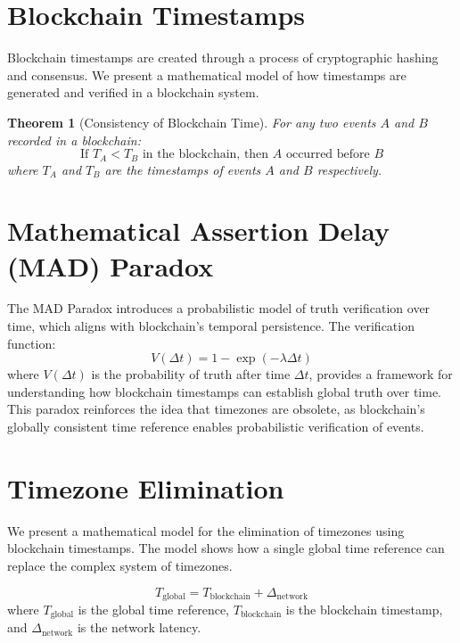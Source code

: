 \documentclass[12pt]{report}
\newtheorem{theorem}{Theorem}
\begin{document}
\section{Blockchain Timestamps}
Blockchain timestamps are created through a process of cryptographic hashing and consensus. We present a mathematical model of how timestamps are generated and verified in a blockchain system.

\begin{theorem}[Consistency of Blockchain Time]
For any two events \( A \) and \( B \) recorded in a blockchain:
\begin{equation}
\text{If } T_A < T_B \text{ in the blockchain, then } A \text{ occurred before } B
\end{equation}
where \( T_A \) and \( T_B \) are the timestamps of events \( A \) and \( B \) respectively.
\end{theorem}

\section{Mathematical Assertion Delay (MAD) Paradox}
The MAD Paradox \cite{Houk2024} introduces a probabilistic model of truth verification over time, which aligns with blockchain's temporal persistence. The verification function:
\[
V(\Delta t) = 1 - \exp\left(-\lambda \Delta t\right)
\]
where \( V(\Delta t) \) is the probability of truth after time \( \Delta t \), provides a framework for understanding how blockchain timestamps can establish global truth over time. This paradox reinforces the idea that timezones are obsolete, as blockchain's globally consistent time reference enables probabilistic verification of events.

\section{Timezone Elimination}
We present a mathematical model for the elimination of timezones using blockchain timestamps. The model shows how a single global time reference can replace the complex system of timezones.

\begin{equation}
T_{\text{global}} = T_{\text{blockchain}} + \Delta_{\text{network}}
\end{equation}
where \( T_{\text{global}} \) is the global time reference, \( T_{\text{blockchain}} \) is the blockchain timestamp, and \( \Delta_{\text{network}} \) is the network latency.
\end{document}

